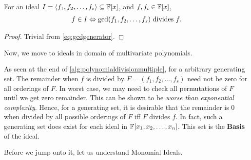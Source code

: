 \documentclass[a4paper,11pt]{article}
\begin{document}
\begin{theorem}
For an ideal $I=\langle f_1,f_2,\ldots,f_s\rangle\subseteq\mathbb{F}[x]$, and $f,f_i\in\mathbb{F}[x]$,
    \begin{equation}
        f\in I\Leftrightarrow \operatorname{gcd}(f_1,f_2,\ldots,f_s) \text{ divides } f.
    \end{equation}
\end{theorem}
\begin{proof}
    Trivial from \ref{eq:gcdgenerator}.
\end{proof}
Now, we move to ideals in domain of multivariate polynomials.

As seen at the end of \ref{alg:polynomialdivisionmultiple}, for a arbitrary generating set. The remainder when $f$ is divided by $F= (f_1,f_2,\ldots,f_s)$ need not be zero for all orderings of $F$. In worst case, we may need to check all permutations of $F$ until we get zero remainder. This can be shown to be \emph{worse than exponential complexity}. Hence, for a generating set, it is desirable that the remainder is 0 when divided by all possible orderings of $F$ iff $F$ divides $f$. In fact, such a generating set does exist for each ideal in $\mathbb{F}[x_1, x_2, \ldots, x_n]$. This set is the \textbf{\Grob Basis} of the ideal.

Before we jump onto it, let us understand Monomial Ideals.%
\end{document}
